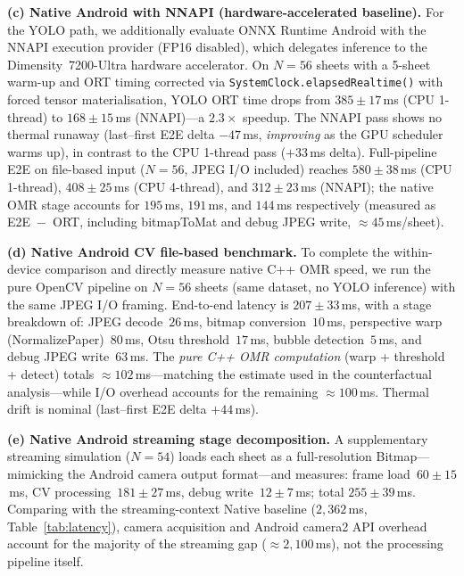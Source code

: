 \documentclass[conference]{IEEEtran}
\begin{document}
\textbf{(c) Native Android with NNAPI (hardware-accelerated baseline).}
For the YOLO path, we additionally evaluate ONNX Runtime Android with
the NNAPI execution provider (FP16 disabled), which delegates inference
to the Dimensity~7200-Ultra hardware accelerator.
On $N=56$ sheets with a 5-sheet warm-up and ORT timing corrected via
\texttt{SystemClock.elapsedRealtime()} with forced tensor materialisation,
YOLO ORT time drops from $385\pm17$\,ms (CPU 1-thread) to
$168\pm15$\,ms (NNAPI)---a $\mathbf{2.3\times}$ speedup.
The NNAPI pass shows no thermal runaway (last--first E2E delta
$-47$\,ms, \emph{improving} as the GPU scheduler warms up),
in contrast to the CPU 1-thread pass ($+33$\,ms delta).
Full-pipeline E2E on file-based input ($N=56$, JPEG I/O included)
reaches $580\pm38$\,ms (CPU 1-thread), $408\pm25$\,ms (CPU 4-thread),
and $312\pm23$\,ms (NNAPI); the native OMR stage accounts for
$195$\,ms, $191$\,ms, and $144$\,ms respectively (measured as
E2E~$-$~ORT, including bitmapToMat and debug JPEG write,
$\approx45$\,ms/sheet).

\textbf{(d) Native Android CV file-based benchmark.}
To complete the within-device comparison and directly measure native
C++ OMR speed, we run the pure OpenCV pipeline on $N=56$ sheets (same
dataset, no YOLO inference) with the same JPEG I/O framing.
End-to-end latency is $207\pm33$\,ms, with a stage breakdown of:
JPEG decode~$26$\,ms, bitmap conversion~$10$\,ms,
perspective warp (NormalizePaper)~$80$\,ms, Otsu threshold~$17$\,ms,
bubble detection~$5$\,ms, and debug JPEG write~$63$\,ms.
The \emph{pure C++ OMR computation} (warp + threshold + detect) totals
$\approx102$\,ms---matching the estimate used in the counterfactual
analysis---while I/O overhead accounts for the remaining $\approx100$\,ms.
Thermal drift is nominal (last--first E2E delta $+44$\,ms).

\textbf{(e) Native Android streaming stage decomposition.}
A supplementary streaming simulation ($N=54$) loads each sheet as a
full-resolution Bitmap---mimicking the Android camera output format---and
measures: frame load~$60\pm15$\,ms, CV processing~$181\pm27$\,ms,
debug write~$12\pm7$\,ms; total $255\pm39$\,ms.
Comparing with the streaming-context Native baseline ($2{,}362$\,ms,
Table~\ref{tab:latency}), camera acquisition and Android camera2 API
overhead account for the majority of the streaming gap ($\approx2{,}100$\,ms),
not the processing pipeline itself.
\end{document}
